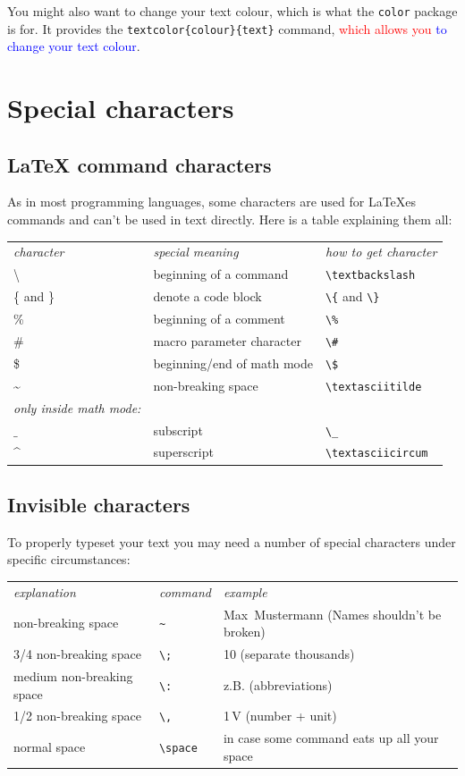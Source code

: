 \documentclass[	%
		fontsize=11pt,  %
		a4paper,	    %
		english,		%
		sans,			%
		f1,				%
	]{HsH-report}		%
\begin{document}
		\medskip
		You might also want to change your text colour, which is what the \lstinline{color} package is for. It provides the
		\lstinline|textcolor{colour}{text}| command, \textcolor{red}{which allows you} \textcolor{blue}{to change your text colour}.

	\pagebreak
	\section{Special characters} \label{sec: special-charaters}

		\subsection{LaTeX command characters}
			As in most programming languages, some characters are used for LaTeXes commands and can't be used in text directly. Here is a table
			explaining them all:

			\smallskip
			\begin{tabular}{l l l}
				\emph{character} & \emph{special meaning} & \emph{how to get character} \\
				\textbackslash & beginning of a command & \lstinline|\textbackslash| \\
				\{ and \} & denote a code block & \lstinline|\{| and \lstinline|\}|\\
				\% & beginning of a comment & \lstinline|\%| \\
				\# & macro parameter character & \lstinline|\#| \\
				\$ & beginning/end of math mode & \lstinline|\$| \\
				\textasciitilde & non-breaking space & \lstinline|\textasciitilde| \\
				\emph{only inside math mode:} \\
				$\_$ & subscript & \lstinline|\_| \\
				\textasciicircum & superscript & \lstinline|\textasciicircum| \\
			\end{tabular}

		\subsection{Invisible characters}
			To properly typeset your text you may need a number of special characters under specific circumstances:

			\smallskip
			\begin{tabular}{l l l}
				\emph{explanation} & \emph{command} & \emph{example} \\
				non-breaking space & \lstinline|~| & Max~Mustermann (Names shouldn't be broken) \\
				3/4 non-breaking space & \lstinline|\;| & 10\;000 (separate thousands)\\
				medium non-breaking space & \lstinline|\:| & z.\:B. (abbreviations) \\
				1/2 non-breaking space & \lstinline|\,| & 1\,V (number + unit) \\
				normal space & \lstinline|\space| & in case some command eats up all your space \\
			\end{tabular}
\end{document}
